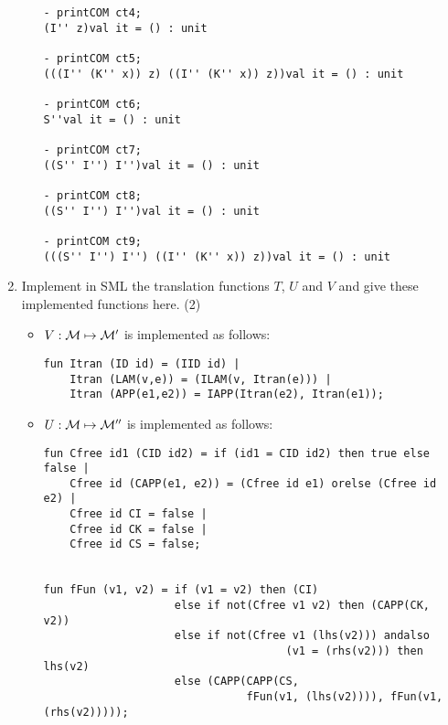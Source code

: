 \documentclass[11pt]{article}
\begin{document}
\begin{enumerate}
\begin{itemize}
\begin{verbatim}
- printCOM ct4;
(I'' z)val it = () : unit

- printCOM ct5;
(((I'' (K'' x)) z) ((I'' (K'' x)) z))val it = () : unit

- printCOM ct6;
S''val it = () : unit

- printCOM ct7;
((S'' I'') I'')val it = () : unit

- printCOM ct8;
((S'' I'') I'')val it = () : unit

- printCOM ct9;
(((S'' I'') I'') ((I'' (K'' x)) z))val it = () : unit

	      	      \end{verbatim}
	      \end{itemize}
	      
	      \color{black}
	      
	\item
	      Implement in SML the translation functions $T$, $U$ and $V$ and give these implemented functions here.
	      \hfill{(2)} %
	      
	      
	      \color{red}
	      \begin{itemize}
	      	\item
	      	      $V:{\cal M}\mapsto {\cal M}'$ is implemented as follows:
	      	      \begin{verbatim}
fun Itran (ID id) = (IID id) |
    Itran (LAM(v,e)) = (ILAM(v, Itran(e))) |
    Itran (APP(e1,e2)) = IAPP(Itran(e2), Itran(e1));
	      	      \end{verbatim}
	      	\item
	      	      $U:{\cal M}\mapsto {\cal M}''$ is implemented as follows:
	      	      \begin{verbatim}
fun Cfree id1 (CID id2) = if (id1 = CID id2) then true else false |
    Cfree id (CAPP(e1, e2)) = (Cfree id e1) orelse (Cfree id e2) |
    Cfree id CI = false |
    Cfree id CK = false |
    Cfree id CS = false;

	
fun fFun (v1, v2) = if (v1 = v2) then (CI) 
                    else if not(Cfree v1 v2) then (CAPP(CK, v2))
                    else if not(Cfree v1 (lhs(v2))) andalso 
                                     (v1 = (rhs(v2))) then lhs(v2)
                    else (CAPP(CAPP(CS, 
                               fFun(v1, (lhs(v2)))), fFun(v1, (rhs(v2)))));
                               

\end{verbatim}
\end{itemize}
\end{enumerate}
\end{document}
